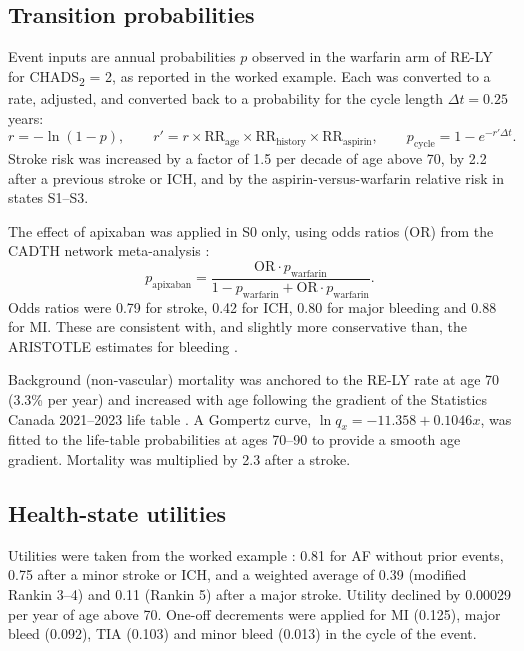 \documentclass[11pt,letterpaper]{article}
\begin{document}
\subsection{Transition probabilities}

Event inputs are annual probabilities $p$ observed in the warfarin arm of RE-LY
\cite{rely} for CHADS\textsubscript{2} = 2, as reported in the worked example. Each was converted
to a rate, adjusted, and converted back to a probability for the cycle length
$\Delta t = 0.25$ years:
\begin{equation}
r = -\ln(1-p), \qquad
r' = r \times \text{RR}_{\text{age}} \times \text{RR}_{\text{history}} \times \text{RR}_{\text{aspirin}},
\qquad
p_{\text{cycle}} = 1 - e^{-r'\Delta t}.
\end{equation}
Stroke risk was increased by a factor of 1.5 per decade of age above 70, by 2.2 after a
previous stroke or ICH, and by the aspirin-versus-warfarin relative risk in states S1--S3.

The effect of apixaban was applied in S0 only, using odds ratios (OR) from the CADTH network
meta-analysis \cite{wells2012}:
\begin{equation}
p_{\text{apixaban}} = \frac{\text{OR}\cdot p_{\text{warfarin}}}{1 - p_{\text{warfarin}} + \text{OR}\cdot p_{\text{warfarin}}}.
\end{equation}
Odds ratios were 0.79 for stroke, 0.42 for ICH, 0.80 for major bleeding and 0.88 for MI. These
are consistent with, and slightly more conservative than, the ARISTOTLE estimates for bleeding
\cite{aristotle}.

Background (non-vascular) mortality was anchored to the RE-LY rate at age 70 (3.3\% per year)
and increased with age following the gradient of the Statistics Canada 2021--2023 life table
\cite{statcanlt}. A Gompertz curve, $\ln q_x = -11.358 + 0.1046x$, was fitted to the life-table
probabilities at ages 70--90 to provide a smooth age gradient. Mortality was multiplied by 2.3
after a stroke.

\subsection{Health-state utilities}

Utilities were taken from the worked example \cite{cadthwe}: 0.81 for AF without prior events,
0.75 after a minor stroke or ICH, and a weighted average of 0.39 (modified Rankin 3--4) and 0.11
(Rankin 5) after a major stroke. Utility declined by 0.00029 per year of age above 70. One-off
decrements were applied for MI (0.125), major bleed (0.092), TIA (0.103) and minor bleed (0.013)
in the cycle of the event.
\end{document}
